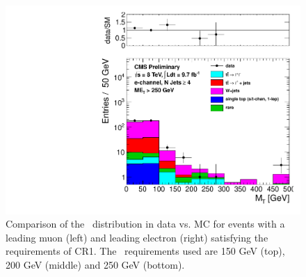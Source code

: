 \begin{figure}[hbt]
\begin{center}
        \includegraphics[width=0.5\linewidth]{plots/CR1plots/mt_met250_leadele_nj4.pdf}
    \caption{
      Comparison of the \mt\ distribution in data vs. MC for events
      with a leading muon (left) and leading electron (right)
      satisfying the requirements of CR1. The \met\ requirements used are
      150 GeV (top), 200 GeV (middle) and 250 GeV (bottom).
\label{fig:cr1mtrest} 
}  
      \end{center}
\end{figure}

